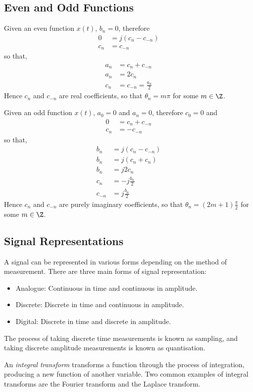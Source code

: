 \documentclass{article}
\begin{document}
\subsection{Even and Odd Functions}
Given an even function \(x\left( t \right)\), \(b_n = 0\), therefore
\begin{align*}
    0   & = j \left( c_n - c_{-n} \right) \\
    c_n & = c_{-n}
\end{align*}
so that,
\begin{align*}
    a_n & = c_n + c_{-n}           \\
    a_n & = 2 c_n                  \\
    c_n & = c_{-n} = \frac{a_n}{2}
\end{align*}
Hence \(c_n\) and \(c_{-n}\) are real coefficients, so that \(\theta_n = m \pi\) for some \(m \in \Z\).

Given an odd function \(x\left( t \right)\), \(a_0 = 0\) and \(a_n =
0\), therefore \(c_0 = 0\) and
\begin{align*}
    0   & = c_n + c_{-n} \\
    c_n & = -c_{-n}
\end{align*}
so that,
\begin{align*}
    b_n    & = j \left( c_n - c_{-n} \right) \\
    b_n    & = j \left( c_n + c_n \right)    \\
    b_n    & = j 2 c_n                       \\
    c_n    & = -j \frac{b_n}{2}              \\
    c_{-n} & = j \frac{b_n}{2}
\end{align*}
Hence \(c_n\) and \(c_{-n}\) are purely imaginary coefficients, so that \(\theta_n = \left( 2m + 1 \right) \frac{\pi}{2}\) for some \(m \in \Z\).
\subsection{Signal Representations}
A signal can be represented in various forms depending on the method of
measurement. There are three main forms of signal representation:
\begin{itemize}
    \item Analogue: Continuous in time and continuous in amplitude.
    \item Discrete: Discrete in time and continuous in amplitude.
    \item Digital: Discrete in time and discrete in amplitude.
\end{itemize}
The process of taking discrete time measurements is known as sampling, and taking discrete amplitude measurements is known as quantisation.
\begin{definition}
    An \textit{integral transform} transforms a function through the process of integration, producing a new function of another variable.
    Two common examples of integral transforms are the Fourier transform and the Laplace transform.
\end{definition}
\end{document}
